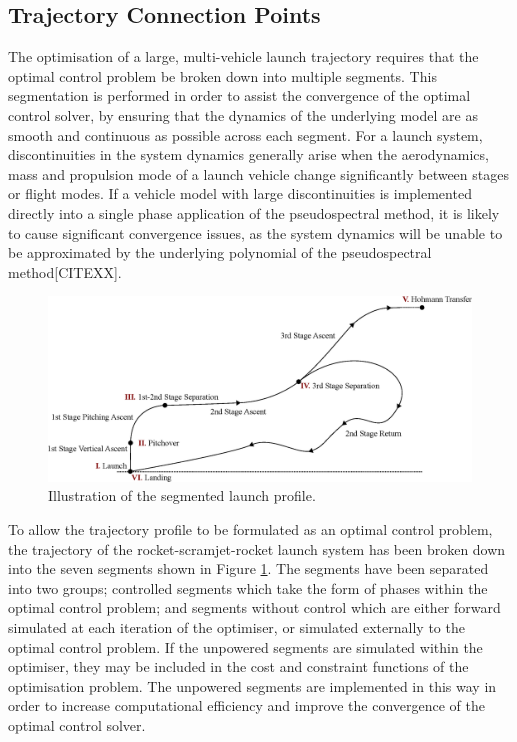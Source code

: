 \subsection{Trajectory Connection Points}
The optimisation of a large, multi-vehicle launch trajectory requires that the optimal control problem be broken down into multiple segments. This segmentation is performed in order to assist the convergence of the optimal control solver, by ensuring that the dynamics of the underlying model are as smooth and continuous as possible across each segment. 
For a launch system, discontinuities in the system dynamics generally arise when the aerodynamics, mass and propulsion mode of a launch vehicle change significantly between stages or flight modes. 
If a vehicle model with large discontinuities is implemented directly into a single phase application of the pseudospectral method, it is likely to cause significant convergence issues, as the system dynamics will be unable to be approximated by the underlying polynomial of the pseudospectral method[CITEXX]. 
 \begin{figure}[ht]
 	\centering
 	\includegraphics[width=1.\linewidth]{figures/4_LODESTAR/Traj}
 	\caption{Illustration of the segmented launch profile.}
 	\label{fig:Traj}
 \end{figure}
 
 To allow the trajectory profile to be formulated as an optimal control problem, the trajectory of the rocket-scramjet-rocket launch system has been broken down into the seven segments shown in Figure \ref{fig:Traj}. 
  The segments have been separated into two groups; controlled segments which take the form of phases within the optimal control problem; and segments without control which are either forward simulated at each iteration of the optimiser, or simulated externally to the optimal control problem. If the unpowered segments are simulated within the optimiser, they may be included in the cost and constraint functions of the optimisation problem.
  The unpowered segments are implemented in this way in order to increase computational efficiency and improve the convergence of the optimal control solver. 
  
